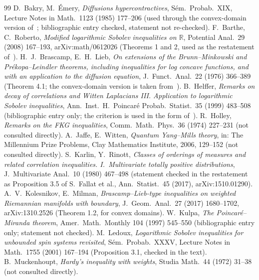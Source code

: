 \documentclass[11pt,a4paper]{article}
\theoremstyle{definition}
\theoremstyle{remark}
\begin{document}
\begin{thebibliography}{99}
 D.~Bakry, M.~Émery, \emph{Diffusions hypercontractives}, Sém.\ Probab.\ XIX, Lecture Notes in Math.\ 1123 (1985) 177--206 (used through the convex-domain version of~\cite{KM}; bibliographic entry checked, statement not re-checked).
 F.~Barthe, C.~Roberto, \emph{Modified logarithmic Sobolev inequalities on $\mathbb R$}, Potential Anal.\ 29 (2008) 167--193, arXiv:math/0612026 (Theorems 1 and 2, used as the restatement of~\cite{Mu}).
 H.~J.~Brascamp, E.~H.~Lieb, \emph{On extensions of the Brunn--Minkowski and Prékopa--Leindler theorems, including inequalities for log concave functions, and with an application to the diffusion equation}, J.\ Funct.\ Anal.\ 22 (1976) 366--389 (Theorem 4.1; the convex-domain version is taken from~\cite{KM}).
 B.~Helffer, \emph{Remarks on decay of correlations and Witten Laplacians III. Application to logarithmic Sobolev inequalities}, Ann.\ Inst.\ H.~Poincaré Probab.\ Statist.\ 35 (1999) 483--508 (bibliographic entry only; the criterion is used in the form of~\cite{Le}).
 R.~Holley, \emph{Remarks on the FKG inequalities}, Comm.\ Math.\ Phys.\ 36 (1974) 227--231 (not consulted directly).
 A.~Jaffe, E.~Witten, \emph{Quantum Yang--Mills theory}, in: The Millennium Prize Problems, Clay Mathematics Institute, 2006, 129--152 (not consulted directly).
 S.~Karlin, Y.~Rinott, \emph{Classes of orderings of measures and related correlation inequalities. I.~Multivariate totally positive distributions}, J.\ Multivariate Anal.\ 10 (1980) 467--498 (statement checked in the restatement as Proposition 3.5 of S.~Fallat et al., Ann.\ Statist.\ 45 (2017), arXiv:1510.01290).
 A.~V.~Kolesnikov, E.~Milman, \emph{Brascamp--Lieb-type inequalities on weighted Riemannian manifolds with boundary}, J.\ Geom.\ Anal.\ 27 (2017) 1680--1702, arXiv:1310.2526 (Theorem 1.2, for convex domains).
 W.~Kulpa, \emph{The Poincaré--Miranda theorem}, Amer.\ Math.\ Monthly 104 (1997) 545--550 (bibliographic entry only; statement not checked).
 M.~Ledoux, \emph{Logarithmic Sobolev inequalities for unbounded spin systems revisited}, Sém.\ Probab.\ XXXV, Lecture Notes in Math.\ 1755 (2001) 167--194 (Proposition 3.1, checked in the text).
 B.~Muckenhoupt, \emph{Hardy's inequality with weights}, Studia Math.\ 44 (1972) 31--38 (not consulted directly).
\end{thebibliography}
\end{document}
